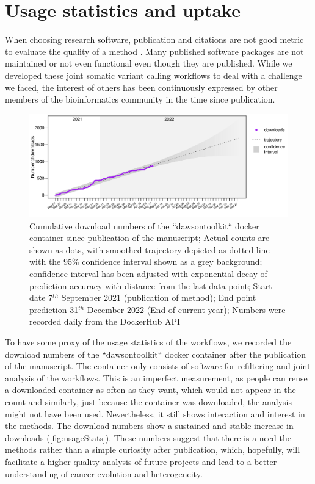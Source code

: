 \section[Usage]{Usage statistics and uptake}
\label{variantcalling-sec:usage}
When choosing research software, publication and citations are not  good metric to evaluate the quality of a method \cite{Gardner2022}. Many published software packages are not maintained or not even functional even though they are published. While we developed these joint somatic variant calling workflows to deal with a challenge we faced, the interest of others has been continuously expressed by other members of the bioinformatics community  in the  time since publication.

\begin{figure}[!ht]
\centering
\includegraphics[width=.99\linewidth]{Figures/jointVariantCalling/dawsontoolkitDownloads.pdf}
\caption[Usage statistics joint workflows]{Cumulative download numbers of the ``dawsontoolkit`` docker container since publication of the manuscript; Actual counts are shown as dots, with smoothed trajectory depicted as dotted line with the 95\% confidence interval shown as a grey background; confidence interval has been adjusted with exponential decay of prediction accuracy with distance from the last data point; Start date 7$^{th}$ September 2021 (publication of method); End point prediction 31$^{th}$ December 2022 (End of current year); Numbers were recorded daily from the DockerHub API}\label{fig:usageStats}
\end{figure}

To have some proxy of the usage statistics of the workflows, we recorded the download numbers of the ``dawsontoolkit`` docker container after the publication of the manuscript. The container only consists of software for refiltering and joint analysis of the workflows. This is an imperfect measurement, as people can reuse a downloaded container as often as they want, which would not appear in the count and similarly, just because the container was downloaded, the analysis might not have been used. Nevertheless, it still shows  interaction and  interest in the methods. The download numbers show a sustained and stable increase in downloads (\autoref{fig:usageStats}). These numbers suggest that there is a need  the methods rather than a simple curiosity after publication, which, hopefully, will facilitate a higher quality analysis of future projects and  lead to a better understanding of cancer evolution and heterogeneity.
